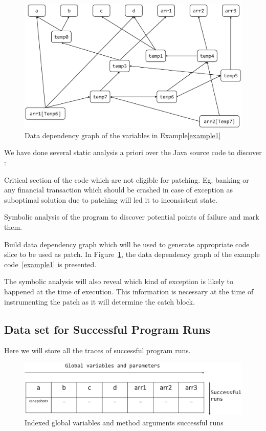 \begin{figure}[t]
\centering
\includegraphics[scale=.25]{images/depG.eps}
\caption{Data dependency graph of the variables in Example\ref{example1}}
\label{fig:datadep}
\end{figure}

We have done several  static analysis a priori  over the Java source code to
discover :
\begin{mylist}
\item Critical section of the code which are not eligible for patching. Eg.
banking or any financial transaction which should be crashed in case of
exception as suboptimal solution due to patching will led it to inconsistent
state.
\item Symbolic analysis of the program to discover potential points of failure
and mark them.
\item Build data dependency graph which will be used to generate appropriate
code slice to be used as patch.
In Figure~\ref{fig:datadep}, the data dependency graph of the example
code~\ref{example1} is presented.
\item The symbolic analysis will also reveal which kind of exception is likely
to happened at the time of execution.
This information is necessary at the time of instrumenting the patch as it will
determine the catch block.
	
\end{mylist}

\subsection{Data set for Successful Program Runs}
\label{subsec:progrun}

Here we will store all the traces of successful program runs.
\begin{figure}[t]
\centering
\includegraphics[scale=.25]{images/succrun.eps}
\caption{Indexed global variables and method arguments successful runs}
\label{fig:succrun}
\end{figure}

